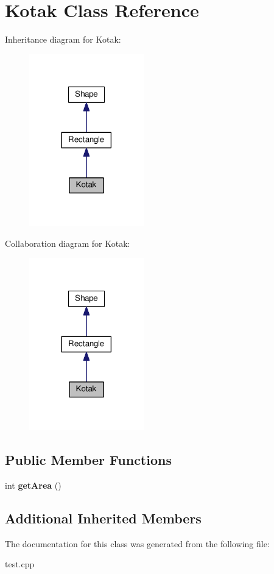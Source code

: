 \hypertarget{classKotak}{}\section{Kotak Class Reference}
\label{classKotak}


Inheritance diagram for Kotak\+:
\nopagebreak
\begin{figure}[H]
\begin{center}
\leavevmode
\includegraphics[width=141pt]{classKotak__inherit__graph}
\end{center}
\end{figure}


Collaboration diagram for Kotak\+:
\nopagebreak
\begin{figure}[H]
\begin{center}
\leavevmode
\includegraphics[width=141pt]{classKotak__coll__graph}
\end{center}
\end{figure}
\subsection*{Public Member Functions}
\begin{DoxyCompactItemize}
\item 
\mbox{\label{classKotak_a5bf7b2ba8f0593eba861e3a041bd48f2}} 
int {\bfseries get\+Area} ()
\end{DoxyCompactItemize}
\subsection*{Additional Inherited Members}


The documentation for this class was generated from the following file\+:\begin{DoxyCompactItemize}
\item 
test.\+cpp\end{DoxyCompactItemize}

